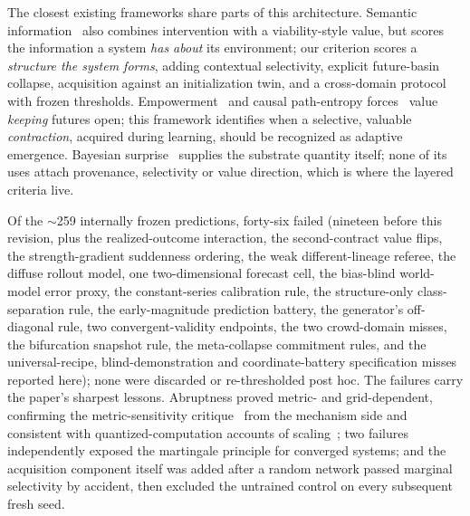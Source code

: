 \documentclass[11pt]{article}
\theoremstyle{definition}
\begin{document}
The closest existing frameworks share parts of this architecture.
Semantic information~\cite{kolchinsky2018} also combines intervention
with a viability-style value, but scores the information a system
\emph{has about} its environment; our criterion scores a
\emph{structure the system forms}, adding contextual selectivity,
explicit future-basin collapse, acquisition against an initialization
twin, and a cross-domain protocol with frozen thresholds.
Empowerment~\cite{klyubin2005,salge2014} and causal path-entropy
forces~\cite{wissnergross2013} value \emph{keeping} futures open; this
framework identifies when a selective, valuable \emph{contraction},
acquired during learning, should be recognized as adaptive emergence.
Bayesian surprise~\cite{ittibaldi2009} supplies the substrate quantity
itself; none of its uses attach provenance, selectivity or value
direction, which is where the layered criteria live.

Of the $\sim$259 internally frozen predictions, forty-six failed
(nineteen before this revision, plus the realized-outcome interaction,
the second-contract value flips, the strength-gradient suddenness
ordering, the weak different-lineage referee, the diffuse rollout
model, one two-dimensional forecast cell, the bias-blind world-model
error proxy, the constant-series calibration rule, the structure-only
class-separation rule, the early-magnitude prediction battery, the
generator's off-diagonal rule, two convergent-validity endpoints, the
two crowd-domain misses, the bifurcation snapshot rule, the
meta-collapse commitment rules, and the universal-recipe,
blind-demonstration and coordinate-battery specification misses
reported here); none
were discarded or re-thresholded post hoc. The failures carry the paper's
sharpest lessons. Abruptness proved metric- and grid-dependent,
confirming the metric-sensitivity critique~\cite{schaeffer2023} from
the mechanism side and consistent with quantized-computation accounts
of scaling~\cite{michaud2023}; two failures independently exposed the
martingale principle for converged systems; and the acquisition
component itself was added after a random network passed marginal
selectivity by accident, then excluded the untrained control on every
subsequent fresh seed.
\end{document}

